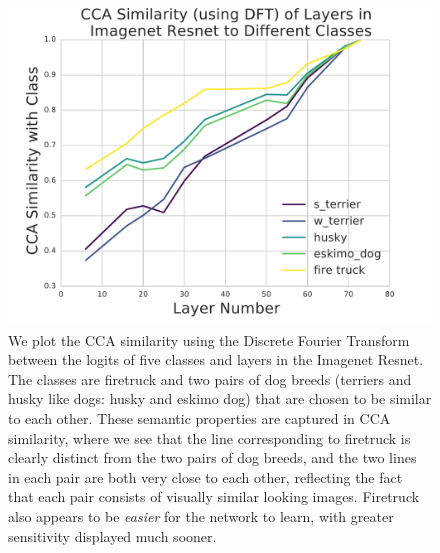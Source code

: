 \documentclass{article} %
\begin{document}
\begin{figure}

   \centering
   \includegraphics[scale=0.4]{camera_ready_plots/imagenet_interpretability.pdf}
   \vspace*{-5mm}
   \caption{\small We plot the CCA similarity using the Discrete Fourier Transform between the logits of five classes and layers in the Imagenet Resnet. The classes are firetruck and two pairs of dog breeds (terriers and husky like dogs: husky and eskimo dog) that are chosen to be similar to each other. These semantic properties are captured in CCA similarity, where we see that the line corresponding to firetruck is clearly distinct from the two pairs of dog breeds, and the two lines in each pair are both very close to each other, reflecting the fact that each pair consists of visually similar looking images. Firetruck also appears to be \textit{easier} for the network to learn, with greater sensitivity displayed much sooner.}
   \label{fig-layer-corrs}
   \centering   
 \end{figure}
\end{document}

